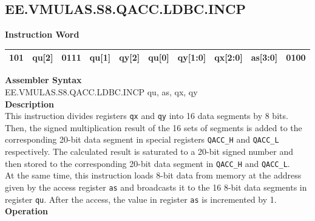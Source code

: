 \clearpage
\subsection{EE.VMULAS.S8.QACC.LDBC.INCP}\label{instruction:EEVMULASS8QACCLDBCINCP}
\setlength\tabcolsep{6pt}
\textbf{Instruction Word} \\
\begin{tabular}{|c|c|c|c|c|c|c|c|c|c|}
	\hline
	101 & qu[2] & 0111 & qu[1] & qy[2] & qu[0] & qy[1:0] & qx[2:0] & as[3:0] & 0100 \\
	\hline
\end{tabular}

\textbf{Assembler Syntax} \\
EE.VMULAS.S8.QACC.LDBC.INCP qu, as, qx, qy \\
\textbf{Description} \\
This instruction divides registers \lstinline{qx} and \lstinline{qy} into 16 data segments by 8 bits. Then, the signed multiplication result of the 16 sets of segments is added to the corresponding 20-bit data segment in special registers \lstinline{QACC_H} and \lstinline{QACC_L} respectively. The calculated result is saturated to a 20-bit signed number and then stored to the corresponding 20-bit data segment in \lstinline{QACC_H} and \lstinline{QACC_L}.\\
At the same time, this instruction loads 8-bit data from memory at the address given by the access register \lstinline{as} and broadcasts it to the 16 8-bit data segments in register \lstinline{qu}. After the access, the value in register \lstinline{as} is incremented by 1.\\
\textbf{Operation}
